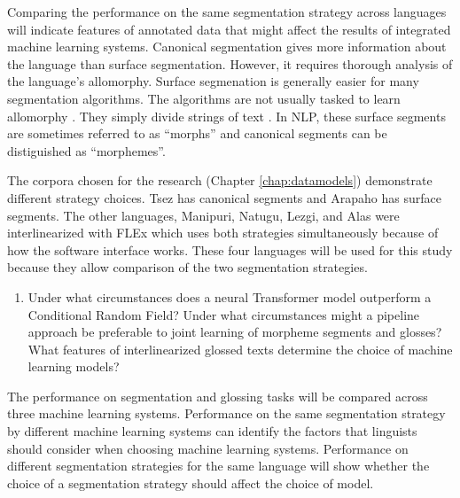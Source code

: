 Comparing the performance on the same segmentation strategy across languages will indicate features of annotated data that might affect the results of integrated machine learning systems. Canonical segmentation gives more information about the language than surface segmentation. However, it requires thorough analysis of the language's allomorphy. 
Surface segmenation is generally easier for many segmentation algorithms. The algorithms are not usually tasked to learn allomorphy \citep{goldsmith_computational_2017}. They simply divide strings of text \citep{virpioja_empirical_2011}. In NLP, these surface segments are sometimes referred to as ``morphs'' and canonical segments can be distiguished as ``morphemes''. 


The corpora chosen for the research (Chapter \ref{chap:datamodels}) demonstrate different strategy choices.  Tsez has canonical segments and Arapaho has surface segments. The other languages, Manipuri, Natugu, Lezgi, and Alas were interlinearized with FLEx which uses both strategies simultaneously because of how the software interface works. These four languages will be used for this study because they allow comparison of the two segmentation strategies. 

\begin{enumerate}[resume]
    \item Under what circumstances does a neural Transformer model outperform a Conditional Random Field? Under what circumstances might a pipeline approach be preferable to joint learning of morpheme segments and glosses? What features of interlinearized glossed texts determine the choice of machine learning models?
\end{enumerate}

The performance on segmentation and glossing tasks will be compared across three machine learning systems.  Performance on the same segmentation strategy by different machine learning systems can identify the factors that linguists should consider when choosing machine learning systems. Performance on different segmentation strategies for the same language will show whether the choice of a segmentation strategy should affect the choice of model.  


